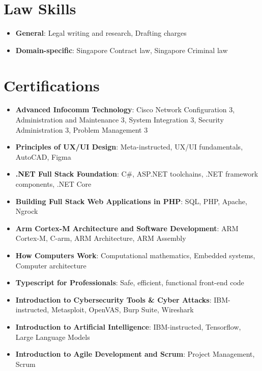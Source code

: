 \documentclass[letterpaper,11pt]{article}
\newcommand{\resumeItem}[2]{
  \item\small{
    \textbf{#1}{: #2 \vspace{-2pt}}
  }
}
\newcommand{\resumeSubItem}[2]{\resumeItem{#1}{#2}\vspace{-4pt}}
\newcommand{\resumeSubHeadingListStart}{\begin{itemize}[leftmargin=*]}
\newcommand{\resumeSubHeadingListEnd}{\end{itemize}}
\begin{document}
 \section{Law Skills}
 \resumeSubHeadingListStart
   \resumeSubItem{General}
      {Legal writing and research, Drafting charges}
   \resumeSubItem{Domain-specific}
      {Singapore Contract law, Singapore Criminal law}
 \resumeSubHeadingListEnd


\section{Certifications}
 \resumeSubHeadingListStart
    \resumeSubItem{Advanced Infocomm Technology}
      {Cisco Network Configuration 3, Administration and Maintenance 3, System Integration 3, Security Administration 3, Problem Management 3}
    \resumeSubItem{Principles of UX/UI Design}
      {Meta-instructed, UX/UI fundamentals, AutoCAD, Figma}
    \resumeSubItem{.NET Full Stack Foundation}
      {C\#, ASP.NET toolchains, .NET framework components, .NET Core}
    \resumeSubItem{Building Full Stack Web Applications in PHP}
      {SQL, PHP, Apache, Ngrock}
    \resumeSubItem{Arm Cortex-M Architecture and Software Development}
      {ARM Cortex-M, C-arm, ARM Architecture, ARM Assembly}
    \resumeSubItem{How Computers Work}
      {Computational mathematics, Embedded systems, Computer architecture}
    \resumeSubItem{Typescript for Professionals}
      {Safe, efficient, functional front-end code}
    \resumeSubItem{Introduction to Cybersecurity Tools \& Cyber Attacks}
      {IBM-instructed, Metasploit, OpenVAS, Burp Suite, Wireshark}
    \resumeSubItem{Introduction to Artificial Intelligence}
      {IBM-instructed, Tensorflow, Large Language Models}
    \resumeSubItem{Introduction to Agile Development and Scrum}
      {Project Management, Scrum}
      
 \resumeSubHeadingListEnd
 
\end{document}
